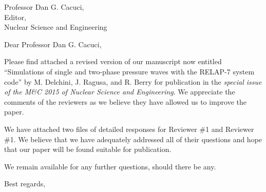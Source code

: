 \begin{letter}{Professor Dan G. Cacuci,\\
    Editor,\\
    Nuclear Science and Engineering}
\date{\today}

\opening{Dear Professor Dan G. Cacuci,}
         \vspace{0.25cm}

Please find attached  a revised version of our manuscript now entitled
``Simulations of single and two-phase pressure waves with the RELAP-7 system code''
by M. Delchini, J. Ragusa, and R. Berry for
publication in the {\em special issue of the M\&C 2015 of Nuclear Science and Engineering}. We appreciate the comments of the reviewers as we
believe they have allowed us to improve the paper.

We have attached two files of detailed responses for Reviewer \#1 and Reviewer \#1. We believe that we have adequately addressed all of their questions and hope that our paper will be found suitable for publication.

\bigskip

We remain available for any further questions, should there be any.
%
%
%

\vspace{0.25cm}



\closing{Best regards, }

\end{letter}


